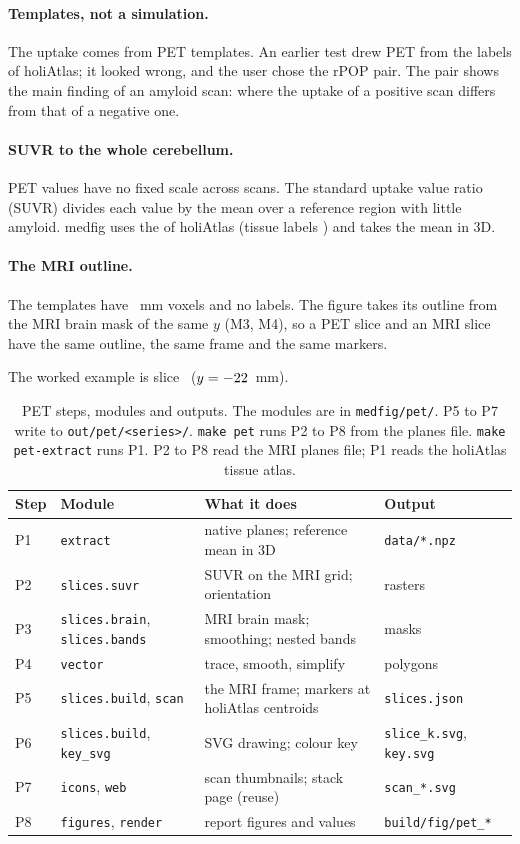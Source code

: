 \documentclass[10pt,a4paper]{article}
\newcommand{\code}[1]{\texttt{#1}}
\begin{document}
\paragraph{Templates, not a simulation.} The uptake comes from PET templates. An earlier test drew PET from the labels of
holiAtlas; it looked wrong, and the user chose the rPOP pair. The pair shows the main finding of an amyloid scan: where the
uptake of a positive scan differs from that of a negative one.

\paragraph{SUVR to the whole cerebellum.} PET values have no fixed scale across scans. The standard uptake value ratio (SUVR)
divides each value by the mean over a reference region with little amyloid. medfig uses the \petRefName{} of holiAtlas
(tissue labels \petRefLabels) and takes the mean in 3D.

\paragraph{The MRI outline.} The templates have \petNativeVs~mm voxels and no labels. The figure takes its outline from the
MRI brain mask of the same $y$ (M3, M4), so a PET slice and an MRI slice have the same outline, the same frame and the same
markers.

\medskip\noindent The worked example is slice~\petExampleK{} ($y=-22$~mm).

\begin{table}[H]\centering\small
\begin{tabularx}{\linewidth}{@{}l l >{\raggedright\arraybackslash}X >{\raggedright\arraybackslash}p{3.7cm}@{}}\toprule
Step & Module & What it does & Output\\\midrule
P1 & \code{extract} & native planes; reference mean in 3D & \code{data/*.npz}\\
P2 & \code{slices.suvr} & SUVR on the MRI grid; orientation & rasters\\
P3 & \code{slices.brain}, \code{slices.bands} & MRI brain mask; smoothing; nested bands & masks\\
P4 & \code{vector} & trace, smooth, simplify & polygons\\
P5 & \code{slices.build}, \code{scan} & the MRI frame; markers at holiAtlas centroids & \code{slices.json}\\
P6 & \code{slices.build}, \code{key\_svg} & SVG drawing; colour key & \code{slice\_k.svg}, \code{key.svg}\\
P7 & \code{icons}, \code{web} & scan thumbnails; stack page (reuse) & \code{scan\_*.svg}\\
P8 & \code{figures}, \code{render} & report figures and values & \code{build/fig/pet\_*}\\\bottomrule
\end{tabularx}
\caption{PET steps, modules and outputs. The modules are in \code{medfig/pet/}. P5 to P7 write to \code{out/pet/<series>/}.
\code{make pet} runs P2 to P8 from the planes file. \code{make pet-extract} runs P1. P2 to P8 read the MRI planes file; P1 reads the holiAtlas tissue atlas.}\label{t:psteps}
\end{table}
\end{document}
